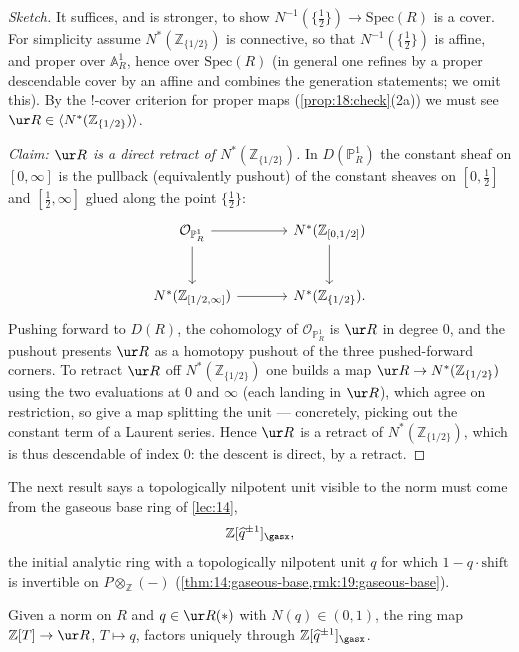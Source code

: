 \begin{proof}[Sketch]
It suffices, and is stronger, to show $N^{-1}(\{\tfrac12\})\to\mathrm{Spec}(R)$
is a cover. For simplicity assume $N^*(\mathbb Z_{\{1/2\}})$ is connective, so
that $N^{-1}(\{\tfrac12\})$ is affine, and proper over $\mathbb A^1_R$, hence over
$\mathrm{Spec}(R)$ (in general one refines by a proper descendable cover by an
affine and combines the generation statements; we omit this). By the
$!$-cover criterion for proper maps (\cref{prop:18:check}(2a)) we must see
$\ur R\in\langle N^*(\mathbb Z_{\{1/2\}})\rangle$.

\emph{Claim: $\ur R$ is a direct retract of $N^*(\mathbb Z_{\{1/2\}})$.} In
$D(\mathbb P^1_R)$ the constant sheaf on $[0,\infty]$ is the pullback (equivalently
pushout) of the constant sheaves on $[0,\tfrac12]$ and $[\tfrac12,\infty]$ glued
along the point $\{\tfrac12\}$:
\begin{equation*}
\begin{tikzcd}[column sep=large, row sep=large]
\mathcal O_{\mathbb P^1_R} \arrow[r] \arrow[d]
& N^*(\mathbb Z_{[0,1/2]}) \arrow[d] \\
N^*(\mathbb Z_{[1/2,\infty]}) \arrow[r] & N^*(\mathbb Z_{\{1/2\}}).
\end{tikzcd}
\end{equation*}
Pushing forward to $D(R)$, the cohomology of $\mathcal O_{\mathbb P^1_R}$ is
$\ur R$ in degree $0$, and the pushout presents $\ur R$ as a homotopy pushout of
the three pushed-forward corners. To retract $\ur R$ off $N^*(\mathbb Z_{\{1/2\}})$
one builds a map $\ur R\to N^*(\mathbb Z_{\{1/2\}})$ using the two evaluations at
$0$ and $\infty$ (each landing in $\ur R$), which agree on restriction, so give a
map splitting the unit --- concretely, picking out the constant term of a Laurent
series. Hence $\ur R$ is a retract of $N^*(\mathbb Z_{\{1/2\}})$, which is thus
descendable of index $0$: the descent is direct, by a retract.
\end{proof}

The next result says a topologically nilpotent unit visible to the norm must come
from the gaseous base ring of \cref{lec:14},
\begin{equation*}
\mathbb Z[\widehat q^{\pm1}]_\gasx,
\end{equation*}
the initial analytic ring with a topologically nilpotent unit $q$ for which
$1-q\cdot\mathrm{shift}$ is invertible on $P\otimes_{\mathbb Z}(-)$
(\cref{thm:14:gaseous-base,rmk:19:gaseous-base}).

\begin{proposition}
\label{prop:20:gaseous-factorization}
Given a norm on $R$ and $q\in\ur R(\ast)$ with $N(q)\in(0,1)$, the ring map
$\mathbb Z[T]\to\ur R$, $T\mapsto q$, factors uniquely through
$\mathbb Z[\widehat q^{\pm1}]_\gasx$.
\end{proposition}


